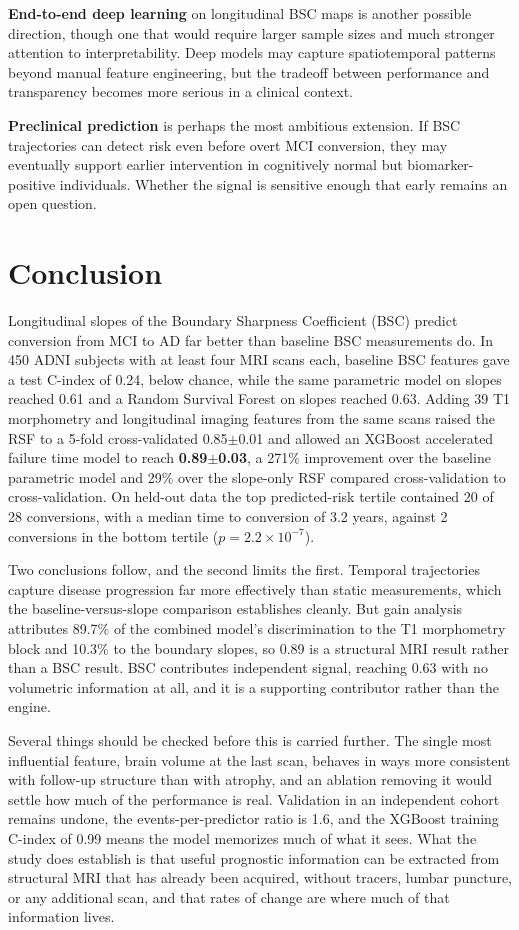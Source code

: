 \documentclass[blue]{ludusofficial}  %
\begin{document}
\textbf{End-to-end deep learning} on longitudinal BSC maps is another possible direction, though one that would require larger sample sizes and much stronger attention to interpretability. Deep models may capture spatiotemporal patterns beyond manual feature engineering, but the tradeoff between performance and transparency becomes more serious in a clinical context.

\textbf{Preclinical prediction} is perhaps the most ambitious extension. If BSC trajectories can detect risk even before overt MCI conversion, they may eventually support earlier intervention in cognitively normal but biomarker-positive individuals. Whether the signal is sensitive enough that early remains an open question.

\section{Conclusion}

Longitudinal slopes of the Boundary Sharpness Coefficient (BSC) predict conversion from MCI to AD far better than baseline BSC measurements do. In 450 ADNI subjects with at least four MRI scans each, baseline BSC features gave a test C-index of 0.24, below chance, while the same parametric model on slopes reached 0.61 and a Random Survival Forest on slopes reached 0.63. Adding 39 T1 morphometry and longitudinal imaging features from the same scans raised the RSF to a 5-fold cross-validated 0.85$\pm$0.01 and allowed an XGBoost accelerated failure time model to reach \textbf{0.89$\pm$0.03}, a 271\% improvement over the baseline parametric model and 29\% over the slope-only RSF compared cross-validation to cross-validation. On held-out data the top predicted-risk tertile contained 20 of 28 conversions, with a median time to conversion of 3.2 years, against 2 conversions in the bottom tertile ($p = 2.2 \times 10^{-7}$).

Two conclusions follow, and the second limits the first. Temporal trajectories capture disease progression far more effectively than static measurements, which the baseline-versus-slope comparison establishes cleanly. But gain analysis attributes 89.7\% of the combined model's discrimination to the T1 morphometry block and 10.3\% to the boundary slopes, so 0.89 is a structural MRI result rather than a BSC result. BSC contributes independent signal, reaching 0.63 with no volumetric information at all, and it is a supporting contributor rather than the engine.

Several things should be checked before this is carried further. The single most influential feature, brain volume at the last scan, behaves in ways more consistent with follow-up structure than with atrophy, and an ablation removing it would settle how much of the performance is real. Validation in an independent cohort remains undone, the events-per-predictor ratio is 1.6, and the XGBoost training C-index of 0.99 means the model memorizes much of what it sees. What the study does establish is that useful prognostic information can be extracted from structural MRI that has already been acquired, without tracers, lumbar puncture, or any additional scan, and that rates of change are where much of that information lives.
\end{document}
